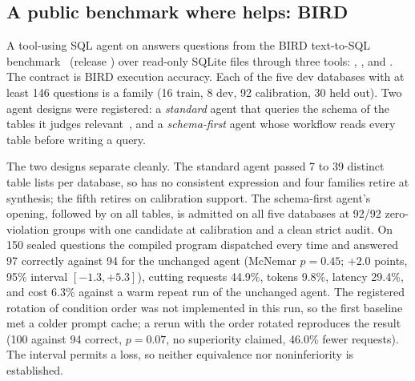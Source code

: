 \subsection{A public benchmark where \method helps: BIRD}
\label{sec:later-bird}

A tool-using SQL agent on  answers questions from the BIRD
text-to-SQL benchmark~\cite{li2023bird} (release ) over read-only
SQLite files through three tools: , ,
and . The contract is BIRD execution accuracy. Each of the five dev
databases with at least 146 questions is a family (16 train, 8 dev, 92 calibration, 30
held out). Two agent designs were registered: a \emph{standard} agent that queries the
schema of the tables it judges relevant~\cite{langchain2026sql}, and a \emph{schema-first}
agent whose workflow reads every table before writing a query.

The two designs separate cleanly. The standard agent passed 7 to 39 distinct table lists
per database, so  has no consistent expression and four
families retire at synthesis; the fifth retires on calibration support. The schema-first
agent's opening,  followed by  on all tables, is
admitted on all five databases at 92/92 zero-violation groups with one candidate at
calibration and a clean strict audit. On 150 sealed questions the compiled program
dispatched every time and answered 97 correctly against 94 for the unchanged agent
(McNemar $p=0.45$; $+2.0$ points, 95\% interval $[-1.3,+5.3]$), cutting requests 44.9\%,
tokens 9.8\%, latency 29.4\%, and cost 6.3\% against a warm repeat run of the unchanged
agent. The registered rotation of condition order was not implemented in this run, so the
first baseline met a colder prompt cache; a rerun with the order rotated reproduces the
result (100 against 94 correct, $p=0.07$, no superiority claimed, 46.0\% fewer requests).
The interval permits a loss, so neither equivalence nor noninferiority is established.

\begin{table}[t]
  \centering
  \caption{BIRD runs. ``Std.'' and ``S.-first'' count databases admitted per design (the
  rotated rerun reuses the primary artifacts). Correct counts are on questions completed
  by all four conditions; bold marks the compiled arm, not a significant improvement.
  Reductions compare the compiled agent with the unchanged agent; $^\dagger$every
  primary-row reduction is against the warm repeat run. Cost$^\ast$ prices every input
  token at the uncached rate.}
  \label{tab:later-bird}
  \footnotesize
  \resizebox{\columnwidth}{!}{}
\end{table}

